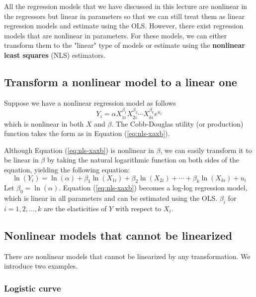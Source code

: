 \documentclass[a4paper,11pt]{article}
\begin{document}
All the regression models that we have discussed in this lecture are
nonlinear in the regressors but linear in parameters so that we can
still treat them as linear regression models and estimate using the
OLS. However, there exist regression models that are nonlinear in
parameters. For these models, we can either transform them to the
"linear" type of models or estimate using the \textbf{nonlinear least
squares} (NLS) estimators.

\subsection{Transform a nonlinear model to a linear one}
\label{sec:org3946152}

Suppose we have a nonlinear regression model as follows
\begin{equation}
\label{eq:nls-xaxb}
Y_i =  \alpha X_{1i}^{\beta_1}X_{2i}^{\beta_2}\cdots X_{ki}^{\beta_k}e^{u_i}
\end{equation}
which is nonlinear in both \(X\) and \(\beta\). The Cobb-Douglas utility
(or production) function takes the form as in Equation
(\ref{eq:nls-xaxb}).

Although Equation (\ref{eq:nls-xaxb}) is nonlinear in \(\beta\), we can
easily transform it to be linear in \(\beta\) by taking the natural
logarithmic function on both sides of the equation, yielding the
following equation:
\begin{equation}
\label{eq:nls-linear-xaxb}
\ln(Y_i) = \ln(\alpha) + \beta_1 \ln(X_{1i}) + \beta_2 \ln(X_{2i}) + \cdots + \beta_k \ln(X_{ki}) + u_i
\end{equation}
Let \(\beta_0 = \ln(\alpha)\). Equation (\ref{eq:nls-xaxb}) becomes a
log-log regression model, which is linear in all parameters and can be
estimated using the OLS. \(\beta_i\) for \(i=1, 2, \ldots, k\) are the
elasticities of \(Y\) with respect to \(X_i\).

\subsection{Nonlinear models that cannot be linearized}
\label{sec:org4dddcd8}

There are nonlinear models that cannot be linearized by any
transformation. We introduce two examples.

\subsubsection*{Logistic curve}
\label{sec:org2ae744d}
\end{document}
